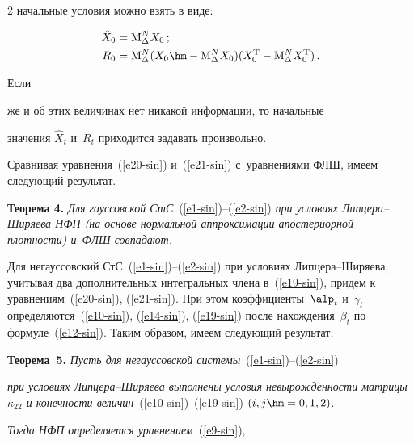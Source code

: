 \begin{multicols}{2}
начальные условия можно взять в виде:

\begin{align*}

\hat{X}_0 &= \mathrm{M}^N_\Delta X_0\,;\\

R_0&= \mathrm{M}^N_\Delta (X_0 \hm-\mathrm{M}^N_\Delta X_0)

(X_0^{\mathrm{T}} - \mathrm{M}^N_\Delta X_0^{\mathrm{T}})\,.

\end{align*}

Если

же и об этих величинах нет никакой информации, то начальные

значения $\hat X_t$ и~$R_t$ приходится задавать произвольно.



Сравнивая  уравнения~(\ref{e20-sin}) и~(\ref{e21-sin}) с~уравнениями ФЛШ, имеем следующий результат.



\smallskip



\noindent

\textbf{Теорема 4.} \textit{Для гауссовской СтС}~(\ref{e1-sin})--(\ref{e2-sin}) \textit{при условиях Лип\-це\-ра--Ши\-ря\-ева НФП (на основе нормальной аппроксимации апостериорной плотности) и~ФЛШ совпадают.}



\smallskip



Для негауссовский СтС~(\ref{e1-sin})--(\ref{e2-sin}) при условиях Лип\-це\-ра--Ши\-ря\-ева, учитывая два дополнительных интегральных члена в~(\ref{e19-sin}), придем к уравнениям~(\ref{e20-sin}), (\ref{e21-sin}). При этом коэффициенты~$\alp_t$ и~$\gamma_t$ определяются~(\ref{e10-sin}), (\ref{e14-sin}), (\ref{e19-sin}) после нахождения~$\beta_t$ по формуле~(\ref{e12-sin}). Таким образом, имеем следующий результат.



\smallskip



\noindent

\textbf{Теорема~5.} \textit{Пусть для негауссовской системы}~(\ref{e1-sin})--(\ref{e2-sin})

\textit{при условиях Лип\-це\-ра--Ши\-ря\-ева выполнены условия невырожденности матрицы~$\kappa_{22}$ и конечности величин}~(\ref{e10-sin})--(\ref{e19-sin}) $(i, j \hm=0,1,2)$.

\textit{Тогда НФП определяется уравнением}~(\ref{e9-sin}),


\end{multicols}
